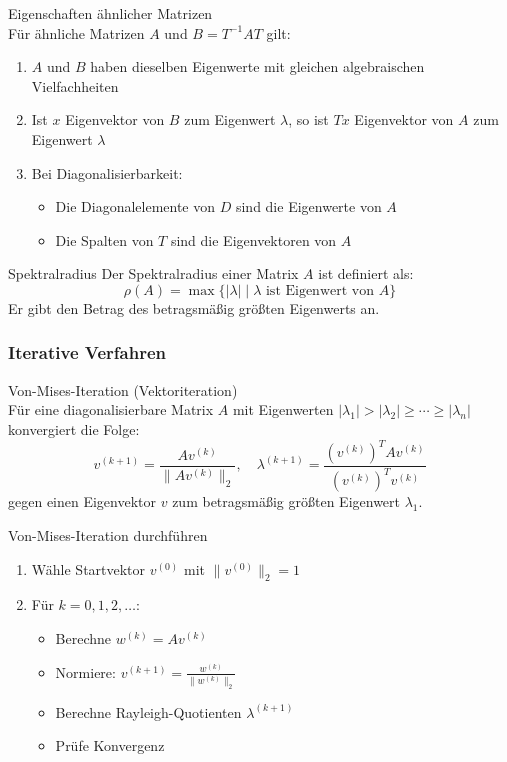 \begin{theorem}{Eigenschaften ähnlicher Matrizen}\\
Für ähnliche Matrizen $A$ und $B = T^{-1}AT$ gilt:
\begin{enumerate}
    \item $A$ und $B$ haben dieselben Eigenwerte mit gleichen algebraischen Vielfachheiten
    \item Ist $x$ Eigenvektor von $B$ zum Eigenwert $\lambda$, so ist $Tx$ Eigenvektor von $A$ zum Eigenwert $\lambda$
    \item Bei Diagonalisierbarkeit:
    \begin{itemize}
        \item Die Diagonalelemente von $D$ sind die Eigenwerte von $A$
        \item Die Spalten von $T$ sind die Eigenvektoren von $A$
    \end{itemize}
\end{enumerate}
\end{theorem}

\begin{definition}{Spektralradius}
Der Spektralradius einer Matrix $A$ ist definiert als:
$$\rho(A) = \max\{|\lambda| \mid \lambda \text{ ist Eigenwert von } A\}$$
Er gibt den Betrag des betragsmäßig größten Eigenwerts an.
\end{definition}

\subsubsection{Iterative Verfahren}

\begin{concept}{Von-Mises-Iteration (Vektoriteration)}\\
Für eine diagonalisierbare Matrix $A$ mit Eigenwerten $|\lambda_1| > |\lambda_2| \geq \cdots \geq |\lambda_n|$ konvergiert die Folge:
$$v^{(k+1)} = \frac{Av^{(k)}}{\|Av^{(k)}\|_2}, \quad
\lambda^{(k+1)} = \frac{(v^{(k)})^TAv^{(k)}}{(v^{(k)})^Tv^{(k)}}$$
gegen einen Eigenvektor $v$ zum betragsmäßig größten Eigenwert $\lambda_1$.
\end{concept}

\begin{KR}{Von-Mises-Iteration durchführen}
\begin{enumerate}
    \item Wähle Startvektor $v^{(0)}$ mit $\|v^{(0)}\|_2 = 1$
    \item Für $k = 0,1,2,\ldots$:
    \begin{itemize}
        \item Berechne $w^{(k)} = Av^{(k)}$
        \item Normiere: $v^{(k+1)} = \frac{w^{(k)}}{\|w^{(k)}\|_2}$
        \item Berechne Rayleigh-Quotienten $\lambda^{(k+1)}$
        \item Prüfe Konvergenz
    \end{itemize}
\end{enumerate}
\end{KR}

